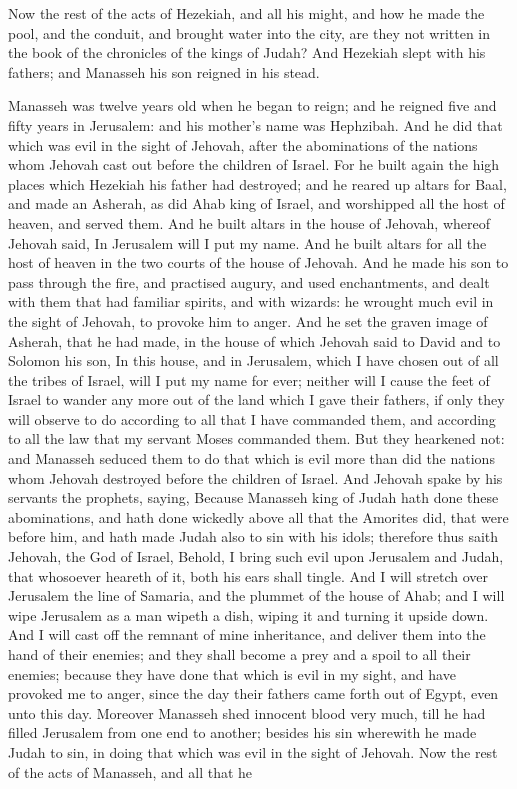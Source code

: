Now the rest of the acts of Hezekiah, and all his might, and how he made the pool, and the conduit, and brought water into the city, are they not written in the book of the chronicles of the kings of Judah? And Hezekiah slept with his fathers; and Manasseh his son reigned in his stead. 

Manasseh was twelve years old when he began to reign; and he reigned five and fifty years in Jerusalem: and his mother’s name was Hephzibah. And he did that which was evil in the sight of Jehovah, after the abominations of the nations whom Jehovah cast out before the children of Israel. For he built again the high places which Hezekiah his father had destroyed; and he reared up altars for Baal, and made an Asherah, as did Ahab king of Israel, and worshipped all the host of heaven, and served them. And he built altars in the house of Jehovah, whereof Jehovah said, In Jerusalem will I put my name. And he built altars for all the host of heaven in the two courts of the house of Jehovah. And he made his son to pass through the fire, and practised augury, and used enchantments, and dealt with them that had familiar spirits, and with wizards: he wrought much evil in the sight of Jehovah, to provoke him to anger. And he set the graven image of Asherah, that he had made, in the house of which Jehovah said to David and to Solomon his son, In this house, and in Jerusalem, which I have chosen out of all the tribes of Israel, will I put my name for ever; neither will I cause the feet of Israel to wander any more out of the land which I gave their fathers, if only they will observe to do according to all that I have commanded them, and according to all the law that my servant Moses commanded them. But they hearkened not: and Manasseh seduced them to do that which is evil more than did the nations whom Jehovah destroyed before the children of Israel.  And Jehovah spake by his servants the prophets, saying, Because Manasseh king of Judah hath done these abominations, and hath done wickedly above all that the Amorites did, that were before him, and hath made Judah also to sin with his idols; therefore thus saith Jehovah, the God of Israel, Behold, I bring such evil upon Jerusalem and Judah, that whosoever heareth of it, both his ears shall tingle. And I will stretch over Jerusalem the line of Samaria, and the plummet of the house of Ahab; and I will wipe Jerusalem as a man wipeth a dish, wiping it and turning it upside down. And I will cast off the remnant of mine inheritance, and deliver them into the hand of their enemies; and they shall become a prey and a spoil to all their enemies; because they have done that which is evil in my sight, and have provoked me to anger, since the day their fathers came forth out of Egypt, even unto this day.  Moreover Manasseh shed innocent blood very much, till he had filled Jerusalem from one end to another; besides his sin wherewith he made Judah to sin, in doing that which was evil in the sight of Jehovah. Now the rest of the acts of Manasseh, and all that he 